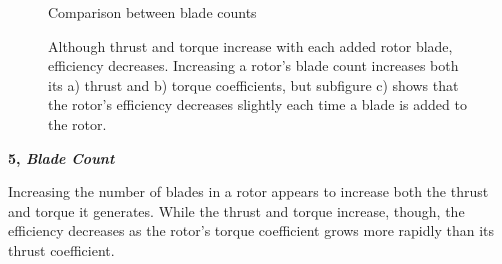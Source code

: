 \documentclass{article}
\begin{document}
\begin{figure}
  \centering
  \caption{Comparison between blade counts}
  \captionsetup{aboveskip=0pt,font=it}
  \caption*{Although thrust and torque increase with each added rotor blade, efficiency decreases. Increasing a rotor's blade count increases both its a) thrust and b) torque coefficients, but subfigure c) shows that the rotor's efficiency decreases slightly each time a blade is added to the rotor.}
  \label{fig:7}
\end{figure}

\textbf{5, \emph{Blade Count}} \newline

Increasing the number of blades in a rotor appears to increase both the thrust and torque it generates. While the thrust and torque increase, though, the efficiency decreases as the rotor's torque coefficient grows more rapidly than its thrust coefficient.

\clearpage
\end{document}
